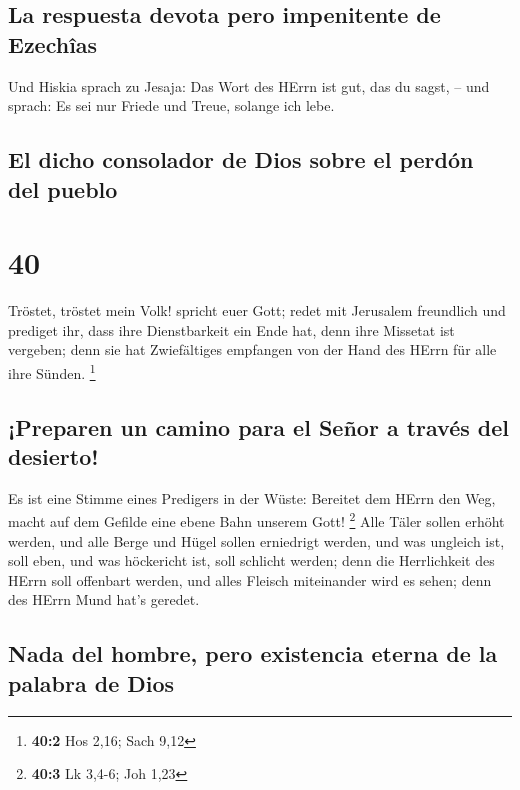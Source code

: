 \hypertarget{la-respuesta-devota-pero-impenitente-de-ezechuxeeas}{%
\subsection{La respuesta devota pero impenitente de
Ezechîas}\label{la-respuesta-devota-pero-impenitente-de-ezechuxeeas}}

 Und Hiskia sprach zu Jesaja: Das Wort des HErrn ist gut,
das du sagst, -- und sprach: Es sei nur Friede und Treue, solange ich
lebe.

\hypertarget{el-dicho-consolador-de-dios-sobre-el-perduxf3n-del-pueblo}{%
\subsection{El dicho consolador de Dios sobre el perdón del
pueblo}\label{el-dicho-consolador-de-dios-sobre-el-perduxf3n-del-pueblo}}

\hypertarget{section-39}{%
\section{40}\label{section-39}}

 Tröstet, tröstet mein Volk! spricht euer Gott;
 redet mit Jerusalem freundlich und prediget ihr, dass
ihre Dienstbarkeit ein Ende hat, denn ihre Missetat ist vergeben; denn
sie hat Zwiefältiges empfangen von der Hand des HErrn für alle ihre
Sünden. \footnote{\textbf{40:2} Hos 2,16; Sach 9,12}

\hypertarget{preparen-un-camino-para-el-seuxf1or-a-travuxe9s-del-desierto}{%
\subsection{¡Preparen un camino para el Señor a través del
desierto!}\label{preparen-un-camino-para-el-seuxf1or-a-travuxe9s-del-desierto}}

 Es ist eine Stimme eines Predigers in der Wüste: Bereitet
dem HErrn den Weg, macht auf dem Gefilde eine ebene Bahn unserem Gott!
\footnote{\textbf{40:3} Lk 3,4-6; Joh 1,23}  Alle Täler
sollen erhöht werden, und alle Berge und Hügel sollen erniedrigt werden,
und was ungleich ist, soll eben, und was höckericht ist, soll schlicht
werden;  denn die Herrlichkeit des HErrn soll offenbart
werden, und alles Fleisch miteinander wird es sehen; denn des HErrn Mund
hat's geredet.

\hypertarget{nada-del-hombre-pero-existencia-eterna-de-la-palabra-de-dios}{%
\subsection{Nada del hombre, pero existencia eterna de la palabra de
Dios}\label{nada-del-hombre-pero-existencia-eterna-de-la-palabra-de-dios}}


